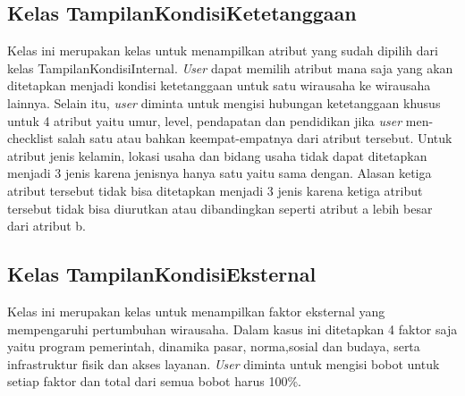 \subsection{Kelas TampilanKondisiKetetanggaan}
Kelas ini merupakan kelas untuk menampilkan atribut yang sudah dipilih dari kelas TampilanKondisiInternal. \textit{User} dapat memilih atribut mana saja yang akan ditetapkan menjadi kondisi ketetanggaan untuk satu wirausaha ke wirausaha lainnya. Selain itu, \textit{user} diminta untuk mengisi hubungan ketetanggaan khusus untuk 4 atribut yaitu umur, level, pendapatan dan pendidikan jika \textit{user} men-checklist salah satu atau bahkan keempat-empatnya dari atribut tersebut. Untuk atribut jenis kelamin, lokasi usaha dan bidang usaha tidak dapat ditetapkan menjadi 3 jenis karena jenisnya hanya satu yaitu sama dengan. Alasan ketiga atribut tersebut tidak bisa ditetapkan menjadi 3 jenis karena ketiga atribut tersebut tidak bisa diurutkan atau dibandingkan seperti atribut a lebih besar dari atribut b.

\subsection{Kelas TampilanKondisiEksternal}
Kelas ini merupakan kelas untuk menampilkan faktor eksternal yang mempengaruhi pertumbuhan wirausaha. Dalam kasus ini ditetapkan 4 faktor saja yaitu program pemerintah, dinamika pasar, norma,sosial dan budaya, serta infrastruktur fisik dan akses layanan. \textit{User} diminta untuk mengisi bobot untuk setiap faktor dan total dari semua bobot harus 100\%.

